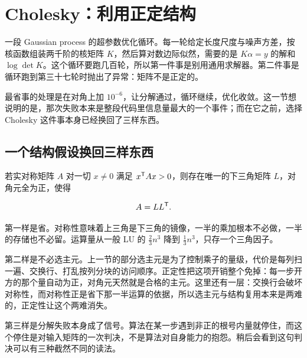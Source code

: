 \section{Cholesky：利用正定结构}
\label{sec:08-Numerical-Analysis/05-Numerical-Linear-Algebra/03}

一段 Gaussian process 的超参数优化循环。每一轮给定长度尺度与噪声方差，按核函数组装两千阶的核矩阵 \(K\)，然后算对数边际似然，需要的是 \(K\alpha=y\) 的解和 \(\log\det K\)。这个循环要跑几百轮，所以第一件事是别用通用求解器。第二件事是循环跑到第三十七轮时抛出了异常：矩阵不是正定的。

最省事的处理是在对角上加 \(10^{-6}\)，让分解通过，循环继续，优化收敛。这一节想说明的是，那次失败本来是整段代码里信息量最大的一个事件；而在它之前，选择 Cholesky 这件事本身已经换回了三样东西。

\subsection{一个结构假设换回三样东西}

若实对称矩阵 \(A\) 对一切 \(x\ne0\) 满足 \(x^{\mathsf{T}}Ax>0\)，则存在唯一的下三角矩阵 \(L\)，对角元全为正，使得

\[
A=LL^{\mathsf{T}}.
\]

第一样是省。对称性意味着上三角是下三角的镜像，一半的乘加根本不必做，一半的存储也不必留。运算量从一般 LU 的 \(\tfrac23n^3\) 降到 \(\tfrac13n^3\)，只存一个三角因子。

第二样是不必选主元。上一节的部分选主元是为了控制乘子的量级，代价是每列扫一遍、交换行、打乱按列分块的访问顺序。正定性把这项开销整个免掉：每一步开方的那个量自动为正，对角元天然就是合格的主元。这里还有一层：交换行会破坏对称性，而对称性正是省下那一半运算的依据，所以选主元与结构复用本来是两难的，正定性让这个两难消失。

第三样是分解失败本身成了信号。算法在某一步遇到非正的根号内量就停住，而这个停住是对输入矩阵的一次判决，不是算法对自身能力的抱怨。稍后会看到这句判决可以有三种截然不同的读法。

